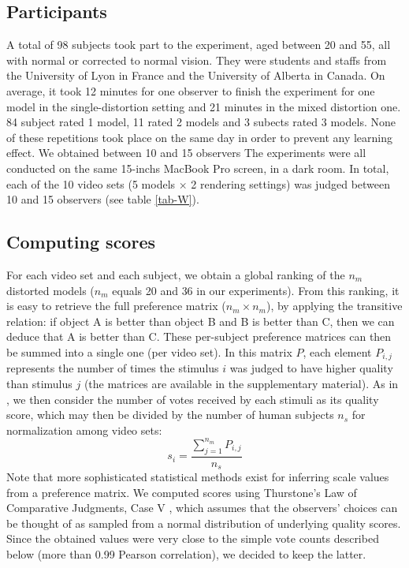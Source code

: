 \subsection{Participants}
A total of 98 subjects took part to the experiment, aged between 20 and 55, all with normal or corrected to normal vision. They were students and staffs from the University of Lyon in France and the University of Alberta in Canada. On average, it took 12 minutes for one observer to finish the experiment for one model in the single-distortion setting and 21 minutes in the mixed distortion one. 84 subject rated 1 model, 11 rated 2 models and 3 subects rated 3 models. None of these repetitions took place on the same day in order to prevent any learning effect. We obtained between 10 and 15 observers The experiments were all conducted on the same 15-inchs MacBook Pro screen, in a dark room. In total, each of the 10 video sets (5 models $\times$ 2 rendering settings) was judged between 10 and 15 observers (see table \ref{tab-W}).\\
\subsection{Computing scores}
For each video set and each subject, we obtain a global ranking of the $n_m$ distorted models ($n_m$ equals 20 and 36 in our experiments). From this ranking, it is easy to retrieve the full preference matrix ($n_m\times n_m$), by applying the transitive relation: if object A is better than object B and B is better than C, then we can deduce that A is better than C. These per-subject preference matrices can then be summed into a single one (per video set). In this matrix $P$, each element $P_{i,j}$ represents the number of times the stimulus $i$ was judged to have higher quality than stimulus $j$ (the matrices are available in the supplementary material). As in \cite{Ledda2005,Mantiuk2012}, we then consider the number of votes received by each stimuli as its quality score, which may then be divided by the number of human subjects $n_s$ for normalization among video sets:
\begin{equation}
 s_i=\frac{\sum_{j=1}^{n_m}{P_{i,j}}}{n_s}
\end{equation}
Note that more sophisticated statistical methods exist for inferring scale values from a preference matrix. We computed scores using Thurstone’s Law of Comparative Judgments, Case V \cite{Thurstone1927}, which assumes that the observers' choices can be thought of as sampled from a normal distribution of underlying quality scores. Since the obtained values were very close to the simple vote counts described below (more than 0.99 Pearson correlation), we decided to keep the latter.

